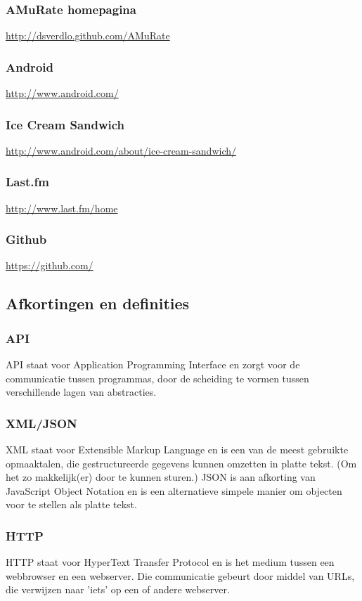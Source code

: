 \documentclass[11pt,a4paper]{article}
\begin{document}
		\subsubsection{AMuRate homepagina}
			\url{http://dsverdlo.github.com/AMuRate}
		\subsubsection{Android}
			\url{http://www.android.com/}
		\subsubsection{Ice Cream Sandwich}
			\url{http://www.android.com/about/ice-cream-sandwich/}	
		\subsubsection{Last.fm}
			\url{http://www.last.fm/home}	
		\subsubsection{Github}
			\url{https://github.com/}

	\subsection{Afkortingen en definities}
		\subsubsection{API}
		API staat voor Application Programming Interface en zorgt voor de communicatie tussen programmas, door de scheiding te vormen tussen verschillende lagen van abstracties.
		\subsubsection{XML/JSON}
		XML staat voor Extensible Markup Language en is een van de meest gebruikte opmaaktalen, die gestructureerde gegevens kunnen omzetten in platte tekst. (Om het zo makkelijk(er) door te kunnen sturen.)
		\newline
		JSON is aan afkorting van JavaScript Object Notation en is een alternatieve simpele manier om objecten voor te stellen als platte tekst.
		\subsubsection{HTTP}
		HTTP staat voor HyperText Transfer Protocol en is het medium tussen een webbrowser en een webserver. Die communicatie gebeurt door middel van URLs, die verwijzen naar 'iets' op een of andere webserver.
\end{document}

